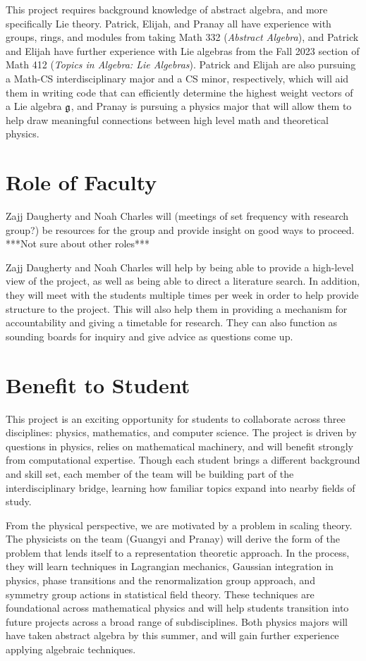\documentclass[11pt, reqno]{amsart}
\begin{document}
This project requires background knowledge of abstract algebra, and more specifically Lie theory. Patrick, Elijah, and Pranay all have experience with groups, rings, and modules from taking Math 332 (\emph{Abstract Algebra}), and Patrick and Elijah have further experience with Lie algebras from the Fall 2023 section of Math 412 (\emph{Topics in Algebra: Lie Algebras}). Patrick and Elijah are also pursuing a Math-CS interdisciplinary major and a CS minor, respectively, which will aid them in writing code that can efficiently determine the highest weight vectors of a Lie algebra $\mathfrak{g}$, and Pranay is pursuing a physics major that will allow them to help draw meaningful connections between high level math and theoretical physics.


\section{Role of Faculty}

Zajj Daugherty and Noah Charles will (meetings of set frequency with research group?) be resources for the group and provide insight on good ways to proceed. ***Not sure about other roles***

Zajj Daugherty and Noah Charles will help by being able to provide a high-level view of the project, as well as being able to direct a literature search. In addition, they will meet with the students multiple times per week in order to help provide structure to the project. This will also help them in providing a mechanism for accountability and giving a timetable for research. They can also function as sounding boards for inquiry and give advice as questions come up.

\section{Benefit to Student}

This project is an exciting opportunity for students to collaborate across three disciplines: physics, mathematics, and computer science. The project is driven by questions in physics, relies on mathematical machinery, and will benefit strongly from computational expertise. Though each student brings a different background and skill set, each member of the team will be building part of the interdisciplinary bridge, learning how familiar topics expand into nearby fields of study. 

From the physical perspective, we are motivated by a problem in scaling theory. The physicists on the team (Guangyi and Pranay) will derive the form of the problem that lends itself to a representation theoretic approach. In the process, they will learn techniques in Lagrangian mechanics, Gaussian integration in physics, phase transitions and the renormalization group approach, and symmetry group actions in statistical field theory. These techniques are foundational across mathematical physics and will help students transition into future projects across a broad range of subdisciplines. Both physics majors will have taken abstract algebra by this summer, and will gain further experience applying algebraic techniques.
\end{document}
